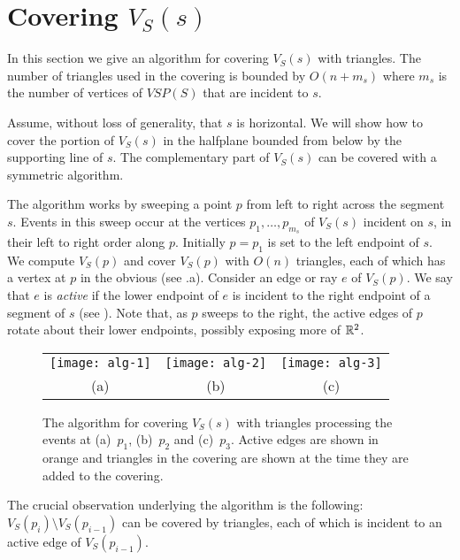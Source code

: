 \documentclass{patmorin}
\newcommand{\VSP}{\mathit{VSP}}
\begin{document}
\section{Covering $V_S(s)$}

In this section we give an algorithm for covering $V_S(s)$ with triangles.
The number of triangles used in the covering is bounded by $O(n+m_s)$ where
$m_s$ is the number of vertices of $\VSP(S)$ that are incident to $s$.

Assume, without loss of generality, that $s$ is horizontal.  We will show
how to cover the portion of $V_S(s)$ in the halfplane bounded from below by
the supporting line of $s$.  The complementary part of $V_S(s)$ can be
covered with a symmetric algorithm.

The algorithm works by sweeping a point $p$ from left to right across the
segment $s$.  Events in this sweep occur at the vertices
$p_1,\ldots,p_{m_s}$ of $V_S(s)$
incident on $s$, in their left to right order along $p$.  Initially $p=p_1$ is set to the left endpoint of $s$.  We
compute $V_S(p)$ and cover $V_S(p)$ with $O(n)$ triangles, each of which
has a vertex at $p$ in the obvious (see .a).  Consider an edge or
ray $e$ of $V_S(p)$.  We say that $e$ is \emph{active} if the lower
endpoint of $e$ is incident to the right endpoint of a segment of $s$ (see
).  Note that, as $p$ sweeps to the right, the active edges of
$p$ rotate about their lower endpoints, possibly exposing more of $\mathbb{R}^2$.

\begin{figure}
  \begin{center}
    \begin{tabular}{ccc}
      \texttt{[image: alg-1]} &
      \texttt{[image: alg-2]} &
      \texttt{[image: alg-3]} \\
      (a) & (b) & (c)
    \end{tabular}
  \end{center}
  \caption{The algorithm for covering $V_S(s)$ with triangles processing
           the events at (a)~$p_1$, (b)~$p_2$ and (c)~$p_3$.  
           Active edges are shown in orange and triangles in the covering
are shown at the time they are added to the covering.}
\end{figure}

The crucial observation underlying the algorithm is the following:
$V_S(p_i) \setminus V_S(p_{i-1})$ can be covered by triangles, each of
which is incident to an active edge of $V_S(p_{i-1})$.
\end{document}
